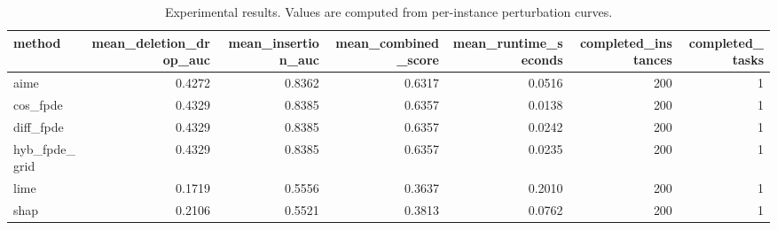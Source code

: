 \begin{table}[t]
\caption{Experimental results. Values are computed from per-instance perturbation curves.}
\label{tab:main_results_computed}
\centering
\begin{tabular}{lrrrrrr}
\toprule
method & mean\_deletion\_drop\_auc & mean\_insertion\_auc & mean\_combined\_score & mean\_runtime\_seconds & completed\_instances & completed\_tasks \\
\midrule
aime & 0.4272 & 0.8362 & 0.6317 & 0.0516 & 200 & 1 \\
cos\_fpde & 0.4329 & 0.8385 & 0.6357 & 0.0138 & 200 & 1 \\
diff\_fpde & 0.4329 & 0.8385 & 0.6357 & 0.0242 & 200 & 1 \\
hyb\_fpde\_grid & 0.4329 & 0.8385 & 0.6357 & 0.0235 & 200 & 1 \\
lime & 0.1719 & 0.5556 & 0.3637 & 0.2010 & 200 & 1 \\
shap & 0.2106 & 0.5521 & 0.3813 & 0.0762 & 200 & 1 \\
\bottomrule
\end{tabular}

\end{table}
